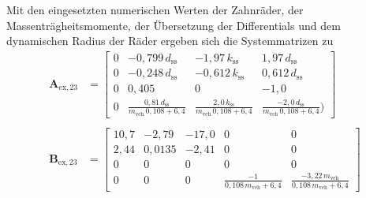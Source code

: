 Mit den eingesetzten numerischen Werten der Zahnräder, der Massenträgheitsmomente, der Übersetzung der Differentials und dem dynamischen Radius der Räder ergeben sich die Systemmatrizen zu
\begin{align}
\pmb{A}_\mathrm{ex,23} &= \begin{bmatrix} 0 & -0,799\,d_\mathrm{ss} & -1,97\,k_\mathrm{ss} & 1,97\,d_\mathrm{ss} \\
0 & -0,248\,d_\mathrm{ss} & -0,612\,k_\mathrm{ss} & 0,612\,d_\mathrm{ss}\\
0 & 0,405 & 0 & -1,0\\
0 & \frac{0,81\,d_\mathrm{ss}}{m_\mathrm{veh}\,0,108 + 6,4} & \frac{2,0\,k_\mathrm{ss}}{m_\mathrm{veh}\,0,108 + 6,4} & \frac{-2,0\,d_\mathrm{ss}}{m_\mathrm{veh}\,0,108 + 6,4})\end{bmatrix}\\
\nonumber \\
\pmb{B}_\mathrm{ex,23} &= \begin{bmatrix} 10,7 & -2,79 & -17,0 & 0 & 0\\
2,44 & 0,0135 & -2,41 & 0 & 0 \\
0 & 0 & 0 & 0 & 0\\
0 & 0 & 0 & \frac{-1}{0,108\,m_\mathrm{veh} + 6,4} & \frac{-3,22\,m_\mathrm{veh}}{0,108\,m_\mathrm{veh} + 6,4} \end{bmatrix}
\end{align}